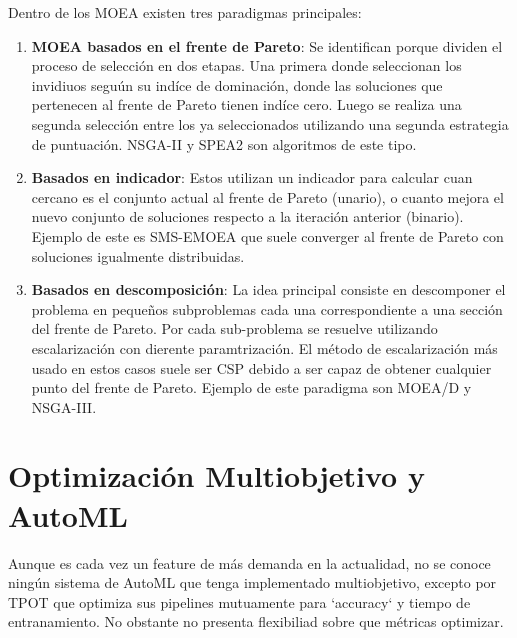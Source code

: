 Dentro de los MOEA existen tres paradigmas principales:
\begin{enumerate}
    \item \textbf{MOEA basados en el frente de Pareto}: Se identifican porque dividen el proceso de selecci\'on en dos etapas. Una primera donde seleccionan los invidiuos segu\'un su ind\'ice de dominaci\'on, donde las soluciones que pertenecen al frente de Pareto tienen ind\'ice cero. Luego se realiza una segunda selecci\'on entre los ya seleccionados utilizando una segunda estrategia de puntuaci\'on. NSGA-II y SPEA2 son algoritmos de este tipo.

    \item \textbf{Basados en indicador}: Estos utilizan un indicador para calcular cuan cercano es el conjunto actual al frente de Pareto (unario), o cuanto mejora el nuevo conjunto de soluciones respecto a la iteraci\'on anterior (binario). Ejemplo de este es SMS-EMOEA que suele converger al frente de Pareto con soluciones igualmente distribuidas.

    \item \textbf{Basados en descomposici\'on}: La idea principal consiste en descomponer el problema en pequeños subproblemas cada una correspondiente a una secci\'on del frente de Pareto. Por cada sub-problema se resuelve utilizando escalarizaci\'on con dierente paramtrizaci\'on. El m\'etodo de escalarizaci\'on m\'as usado en estos casos suele ser CSP debido a ser capaz de obtener cualquier punto del frente de Pareto. Ejemplo de este paradigma son MOEA/D y NSGA-III.
\end{enumerate}


\section{Optimizaci\'on Multiobjetivo y AutoML}

Aunque es cada vez un feature de m\'as demanda en la actualidad, no se conoce ning\'un sistema de AutoML que tenga implementado multiobjetivo, excepto por TPOT que optimiza sus pipelines mutuamente para `accuracy` y tiempo de entranamiento. No obstante no presenta flexibiliad sobre que m\'etricas optimizar.\\


